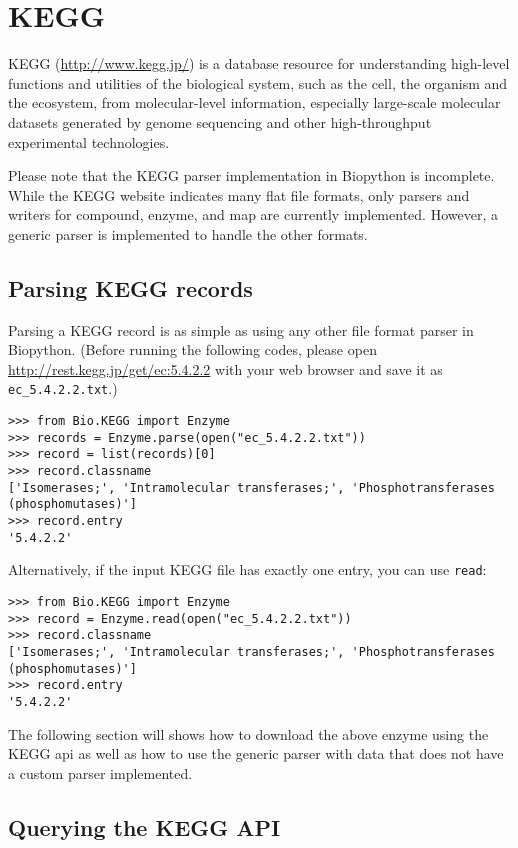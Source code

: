 \chapter{KEGG}
\label{chap:kegg}

KEGG (\url{http://www.kegg.jp/}) is a database resource for understanding high-level functions and utilities of the biological system, such as the cell, the organism and the ecosystem, from molecular-level information, especially large-scale molecular datasets generated by genome sequencing and other high-throughput experimental technologies.

Please note that the KEGG parser implementation in Biopython is incomplete. While the KEGG website indicates many flat file formats, only parsers and writers for compound, enzyme, and map are currently implemented. However, a generic parser is implemented to handle the other formats.

\section{Parsing KEGG records}
Parsing a KEGG record is as simple as using any other file format parser in Biopython. 
(Before running the following codes, please open \url{http://rest.kegg.jp/get/ec:5.4.2.2} with your web browser and save it as \verb|ec_5.4.2.2.txt|.)

\begin{verbatim}
>>> from Bio.KEGG import Enzyme
>>> records = Enzyme.parse(open("ec_5.4.2.2.txt"))
>>> record = list(records)[0]
>>> record.classname
['Isomerases;', 'Intramolecular transferases;', 'Phosphotransferases (phosphomutases)']
>>> record.entry
'5.4.2.2'
\end{verbatim}

Alternatively, if the input KEGG file has exactly one entry, you can use \verb|read|:

\begin{verbatim}
>>> from Bio.KEGG import Enzyme
>>> record = Enzyme.read(open("ec_5.4.2.2.txt"))
>>> record.classname
['Isomerases;', 'Intramolecular transferases;', 'Phosphotransferases (phosphomutases)']
>>> record.entry
'5.4.2.2'
\end{verbatim}

The following section will shows how to download the above enzyme using the KEGG api as well as how to use the generic parser with data that does not have a custom parser implemented.

\section{Querying the KEGG API}

